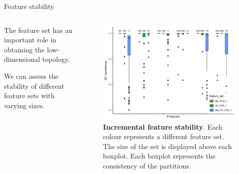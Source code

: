\begin{frame}{Feature stability}
    \begin{columns}
        \begin{column}{0.45\textwidth}
            \justifying

            The feature set has an important role in obtaining the low-dimensional topology.
            \bigskip


            We can assess the stability of different feature sets with varying sizes.
            \bigskip


        \end{column}

        \begin{column}{0.5\textwidth}
            \begin{figure}
                \centering
                \includegraphics[width=\textwidth]{images/ch3/3_feat_incremental.png}
                \caption{\justifying \textbf{Incremental feature stability}. Each colour represents a different feature set. The size of the set is displayed above each boxplot. Each boxplot represents the consistency of the partitions. }
            \end{figure}
        \end{column}
    \end{columns}
\end{frame}

